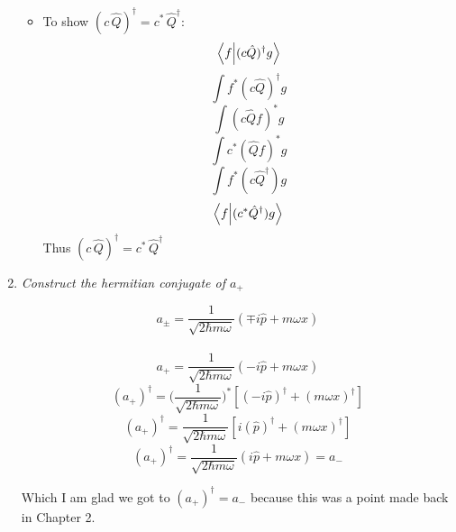 \documentclass[12pt]{article}
\begin{document}
\begin{enumerate}[label=\alph*)]
\begin{itemize}
\item To show $(c\,\hat{Q})^\dagger = c^*\,\hat{Q}^\dagger$:
\[\braket{f}{(c\hat{Q})^\dagger g}\]
\[\int f^* (c\hat{Q})^\dagger g\]
\[\int (c\hat{Q}f)^* g\]
\[\int c^* (\hat{Q}f)^* g\]
\[\int f^*(c\hat{Q}^\dagger)g\]
\[\braket{f}{(c^*\hat{Q}^\dagger) g}\]
Thus $(c\,\hat{Q})^\dagger = c^*\,\hat{Q}^\dagger$
\bigskip
\end{itemize}

\item \emph{Construct the hermitian conjugate of $a_+$}
\bigskip

\[a_\pm = \frac{1}{\sqrt{2 \hbar m \omega}} (\mp i \hat{p} + m \omega x)\]\
\bigskip
\[a_+ = \frac{1}{\sqrt{2 \hbar m \omega}} (- i \hat{p} + m \omega x)\]
\[(a_+)^\dagger = \Big(\frac{1}{\sqrt{2 \hbar m \omega}}\Big)^* [(- i \hat{p})^\dagger + (m \omega x)^\dagger]\]
\[(a_+)^\dagger = \frac{1}{\sqrt{2 \hbar m \omega}} [i (\hat{p})^\dagger + (m \omega x)^\dagger]\]
\[(a_+)^\dagger = \frac{1}{\sqrt{2 \hbar m \omega}} (i \hat{p} + m \omega x) = a_-\]

\bigskip

Which I am glad we got to $(a_+)^\dagger = a_-$ because this was a point made back in Chapter 2. 
\end{enumerate}
\end{document}

